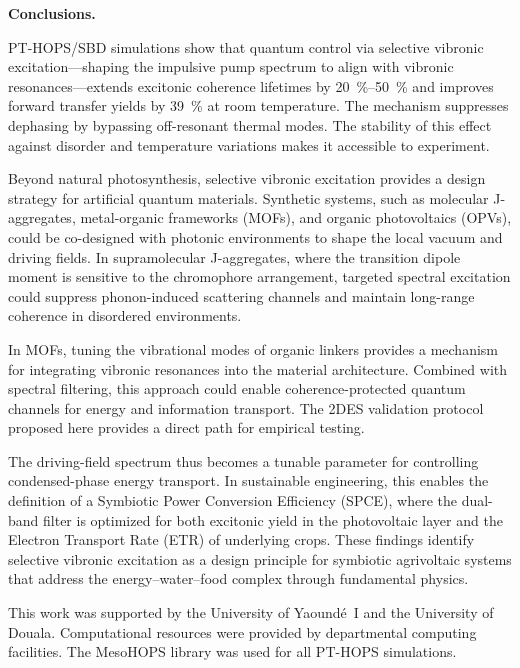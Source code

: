 \documentclass[journal=jpcl,manuscript=letter]{achemso}
\begin{document}
\textbf{Conclusions.}

PT-HOPS/SBD simulations show that quantum control via selective vibronic excitation---shaping the impulsive pump spectrum to align with vibronic resonances---extends excitonic coherence lifetimes by \SIrange{20}{50}{\percent} and improves forward transfer yields by \SI{39}{\percent} at room temperature. The mechanism suppresses dephasing by bypassing off-resonant thermal modes. The stability of this effect against disorder and temperature variations makes it accessible to experiment.

Beyond natural photosynthesis, selective vibronic excitation provides a design strategy for artificial quantum materials. Synthetic systems, such as molecular J-aggregates, metal-organic frameworks (MOFs), and organic photovoltaics (OPVs), could be co-designed with photonic environments to shape the local vacuum and driving fields. In supramolecular J-aggregates, where the transition dipole moment is sensitive to the chromophore arrangement, targeted spectral excitation could suppress phonon-induced scattering channels and maintain long-range coherence in disordered environments.

In MOFs, tuning the vibrational modes of organic linkers provides a mechanism for integrating vibronic resonances into the material architecture. Combined with spectral filtering, this approach could enable coherence-protected quantum channels for energy and information transport. The 2DES validation protocol proposed here provides a direct path for empirical testing.

The driving-field spectrum thus becomes a tunable parameter for controlling condensed-phase energy transport. In sustainable engineering, this enables the definition of a Symbiotic Power Conversion Efficiency (SPCE), where the dual-band filter is optimized for both excitonic yield in the photovoltaic layer and the Electron Transport Rate (ETR) of underlying crops. These findings identify selective vibronic excitation as a design principle for symbiotic agrivoltaic systems that address the energy--water--food complex through fundamental physics.


\begin{acknowledgement}
This work was supported by the University of Yaoundé~I and the University of Douala. Computational resources were provided by departmental computing facilities. The MesoHOPS library was used for all PT-HOPS simulations.
\end{acknowledgement}
\end{document}
